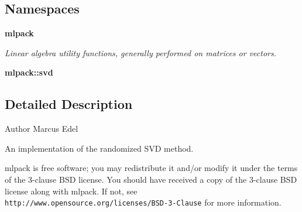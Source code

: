 \subsection*{Namespaces}
\begin{DoxyCompactItemize}
\item 
 {\bf mlpack}
\begin{DoxyCompactList}\small\item\em Linear algebra utility functions, generally performed on matrices or vectors. \end{DoxyCompactList}\item 
 {\bf mlpack\+::svd}
\end{DoxyCompactItemize}


\subsection{Detailed Description}
\begin{DoxyAuthor}{Author}
Marcus Edel
\end{DoxyAuthor}
An implementation of the randomized S\+VD method.

mlpack is free software; you may redistribute it and/or modify it under the terms of the 3-\/clause B\+SD license. You should have received a copy of the 3-\/clause B\+SD license along with mlpack. If not, see {\tt http\+://www.\+opensource.\+org/licenses/\+B\+S\+D-\/3-\/\+Clause} for more information. 